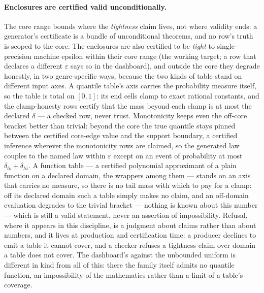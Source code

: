\paragraph{Enclosures are certified valid unconditionally.} The core
range bounds where the \emph{tightness} claim lives, not where
validity ends: a generator's certificate is a bundle of unconditional
theorems, and no row's truth is scoped to the core. The enclosures
are also certified to be \emph{tight} to single-precision machine
epsilon within their core range (the working target; a row that
declares a different $\varepsilon$ says so in the dashboard), and
outside the core they degrade honestly, in two genre-specific ways,
because the two kinds of table stand on different input axes. A
quantile table's axis carries the probability measure itself, so the
table is total on $[0,1]$: its end cells clamp to exact rational
constants, and the clamp-honesty rows certify that the mass beyond
each clamp is at most the declared $\delta$ --- a checked row, never
trust. Monotonicity keeps even the off-core bracket better than
trivial: beyond the core the true quantile stays pinned between the
certified core-edge value and the support boundary, a certified
inference wherever the monotonicity rows are claimed, so the
generated law couples to the named law within $\varepsilon$ except on
an event of probability at most $\delta_{lo} + \delta_{hi}$. A
function table --- a certified polynomial approximant of a plain
function on a declared domain, the wrappers among them --- stands on
an axis that carries no measure, so there is no tail mass with which
to pay for a clamp: off its declared domain such a table simply makes
no claim, and an off-domain evaluation degrades to the trivial
bracket --- nothing is known about this number --- which is still a
valid statement, never an assertion of impossibility. Refusal, where
it appears in this discipline, is a judgment about claims rather than
about numbers, and it lives at production and certification time: a
producer declines to emit a table it cannot cover, and a checker
refuses a tightness claim over domain a table does not cover. The
dashboard's \dredx{} against the unbounded uniform is different in
kind from all of this: there the family itself admits no quantile
function, an impossibility of the mathematics rather than a limit of
a table's coverage.

